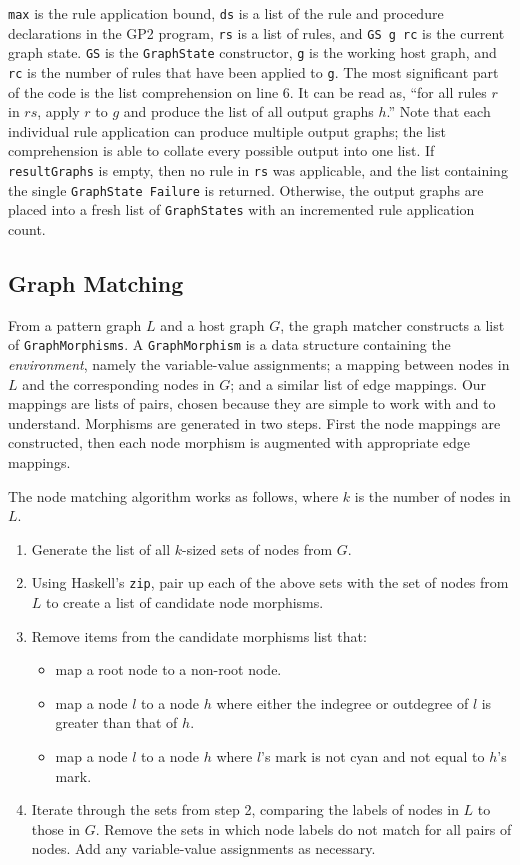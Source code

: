 \texttt{max} is the rule application bound, \texttt{ds} is a list of the rule and procedure declarations in the GP2 program, \texttt{rs} is a list of rules, and \texttt{GS g rc} is the current graph state. \texttt{GS} is the \texttt{GraphState} constructor, \texttt{g} is the working host graph, and \texttt{rc} is the number of rules that have been applied to \texttt{g}. The most significant part of the code is the list comprehension on line 6. It can be read as, ``for all rules $r$ in $rs$, apply $r$ to $g$ and produce the list of all output graphs $h$.'' Note that each individual rule application can produce multiple output graphs; the list comprehension is able to collate every possible output into one list. If \texttt{resultGraphs} is empty, then no rule in \texttt{rs} was applicable, and the list containing the single \texttt{GraphState Failure} is returned. Otherwise, the output graphs are placed into a fresh list of \texttt{GraphStates} with an incremented rule application count.


\subsection{Graph Matching}

From a pattern graph $L$ and a host graph $G$, the graph matcher constructs a list of \texttt{GraphMorphisms}. A \texttt{GraphMorphism} is a data structure containing the \textit{environment}, namely the variable-value assignments; a mapping between nodes in $L$ and the corresponding nodes in $G$; and a similar list of edge mappings. Our mappings are lists of pairs, chosen because they are simple to work with and to understand. Morphisms are generated in two steps. First the node mappings are constructed, then each node morphism is augmented with appropriate edge mappings. 

The node matching algorithm works as follows, where $k$ is the number of nodes in $L$. 

\begin{enumerate}
\item Generate the list of all $k$-sized sets of nodes from $G$.
\item Using Haskell's \texttt{zip}, pair up each of the above sets with the set of nodes from $L$ to create a list of candidate node morphisms.
\item Remove items from the candidate morphisms list that:
  \begin{itemize}
  \item map a root node to a non-root node.
  \item map a node $l$ to a node $h$ where either the indegree or outdegree of $l$ is greater than that of $h$.
  \item map a node $l$ to a node $h$ where $l$'s mark is not cyan and not equal to $h$'s mark.
  \end{itemize}
\item Iterate through the sets from step 2, comparing the labels of nodes in $L$ to those in $G$. Remove the sets in which node labels do not match for all pairs of nodes. Add any variable-value assignments as necessary.
\end{enumerate}

